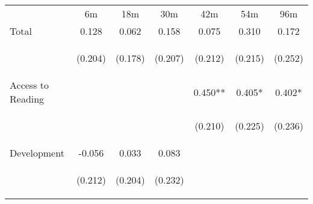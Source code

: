 \begin{tabular}{lcccccc}
\hline \noalign{\smallskip} & 6m & 18m & 30m & 42m & 54m & 96m\\
\noalign{\smallskip}\hline \noalign{\smallskip}Total & 0.128 & 0.062 & 0.158 & 0.075 & 0.310 & 0.172\\
 & \begin{footnotesize}(0.204)\end{footnotesize} & \begin{footnotesize}(0.178)\end{footnotesize} & \begin{footnotesize}(0.207)\end{footnotesize} & \begin{footnotesize}(0.212)\end{footnotesize} & \begin{footnotesize}(0.215)\end{footnotesize} & \begin{footnotesize}(0.252)\end{footnotesize}\\
\noalign{\smallskip}Access to Reading &  &  &  & 0.450** & 0.405* & 0.402*\\
 & \begin{footnotesize}\end{footnotesize} & \begin{footnotesize}\end{footnotesize} & \begin{footnotesize}\end{footnotesize} & \begin{footnotesize}(0.210)\end{footnotesize} & \begin{footnotesize}(0.225)\end{footnotesize} & \begin{footnotesize}(0.236)\end{footnotesize}\\
\noalign{\smallskip}Development & -0.056 & 0.033 & 0.083 &  &  & \\
 & \begin{footnotesize}(0.212)\end{footnotesize} & \begin{footnotesize}(0.204)\end{footnotesize} & \begin{footnotesize}(0.232)\end{footnotesize} & \begin{footnotesize}\end{footnotesize} & \begin{footnotesize}\end{footnotesize} & \begin{footnotesize}\end{footnotesize}\\

\end{tabular}
